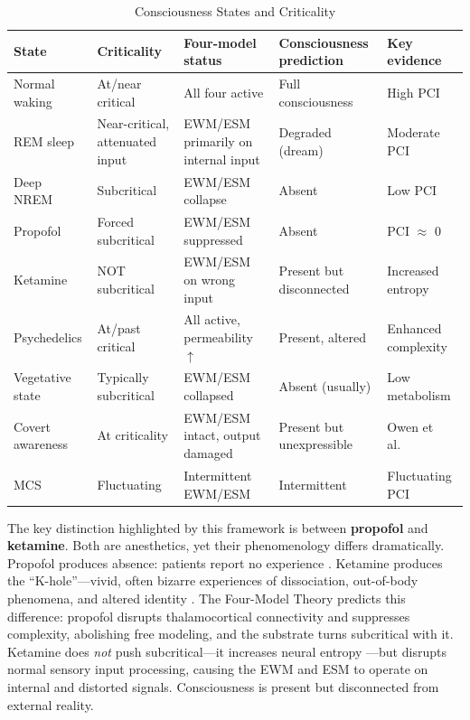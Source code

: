 \documentclass[12pt]{article}
\begin{document}
\begin{table}[htbp]
\centering
\caption{Consciousness States and Criticality}
\label{tab:consciousness-states}
\small
\renewcommand{\arraystretch}{1.4}
\begin{tabularx}{\textwidth}{>{\raggedright}p{1.9cm} >{\raggedright}p{1.7cm} >{\raggedright}p{3.2cm} X >{\raggedright\arraybackslash}p{2cm}}
\toprule
\textbf{State} & \textbf{Criticality} & \textbf{Four-model status} & \textbf{Consciousness prediction} & \textbf{Key evidence} \\
\midrule
Normal waking & At/near critical & All four active & Full consciousness & High PCI \\
REM sleep & Near-critical, attenuated input & EWM/ESM primarily on internal input & Degraded (dream) & Moderate PCI \\
Deep NREM & Subcritical & EWM/ESM collapse & Absent & Low PCI \\
Propofol & Forced subcritical & EWM/ESM suppressed & Absent & PCI $\approx$ 0 \\
Ketamine & NOT subcritical & EWM/ESM on wrong input & Present but disconnected & Increased entropy \\
Psychedelics & At/past critical & All active, permeability $\uparrow$ & Present, altered & Enhanced complexity \\
Vegetative state & Typically subcritical & EWM/ESM collapsed & Absent (usually) & Low metabolism \\
Covert awareness & At criticality & EWM/ESM intact, output damaged & Present but unexpressible & Owen et al.\ \\
MCS & Fluctuating & Intermittent EWM/ESM & Intermittent & Fluctuating PCI \\
\bottomrule
\end{tabularx}
\end{table}

The key distinction highlighted by this framework is between \textbf{propofol} and \textbf{ketamine}. Both are anesthetics, yet their phenomenology differs dramatically. Propofol produces absence: patients report no experience \citep{Alkire2000,Boly2012}. Ketamine produces the ``K-hole''---\hspace{0pt}vivid, often bizarre experiences of dissociation, out-of-body phenomena, and altered identity \citep{Corlett2011}. The Four-Model Theory predicts this difference: propofol disrupts thalamocortical connectivity and suppresses complexity, abolishing free modeling, and the substrate turns subcritical with it. Ketamine does \emph{not} push subcritical---\hspace{0pt}it increases neural entropy \citep{Schartner2017}---\hspace{0pt}but disrupts normal sensory input processing, causing the EWM and ESM to operate on internal and distorted signals. Consciousness is present but disconnected from external reality.
\end{document}
